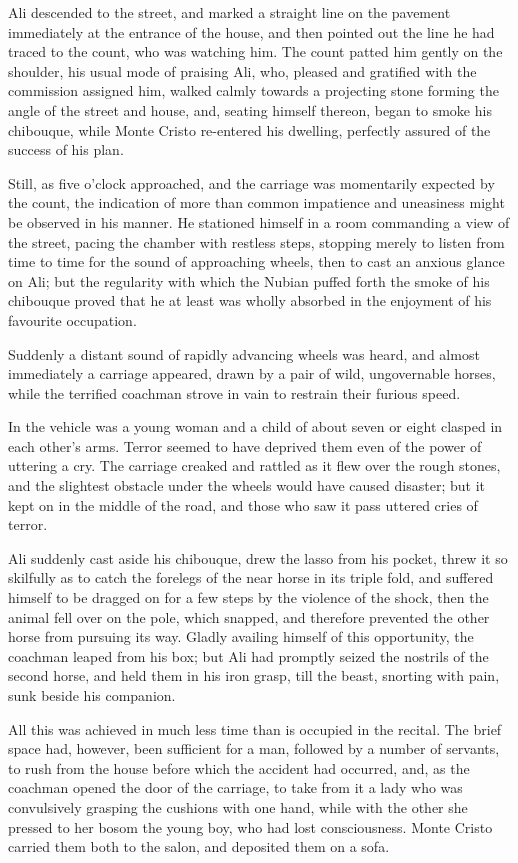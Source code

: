  Ali descended to the street, and marked a straight line on the pavement immediately at the entrance of the house, and then pointed out the line he had traced to the count, who was watching him. The count patted him gently on the shoulder, his usual mode of praising Ali, who, pleased and gratified with the commission assigned him, walked calmly towards a projecting stone forming the angle of the street and house, and, seating himself thereon, began to smoke his chibouque, while Monte Cristo re-entered his dwelling, perfectly assured of the success of his plan. 

 Still, as five o'clock approached, and the carriage was momentarily expected by the count, the indication of more than common impatience and uneasiness might be observed in his manner. He stationed himself in a room commanding a view of the street, pacing the chamber with restless steps, stopping merely to listen from time to time for the sound of approaching wheels, then to cast an anxious glance on Ali; but the regularity with which the Nubian puffed forth the smoke of his chibouque proved that he at least was wholly absorbed in the enjoyment of his favourite occupation. 

 Suddenly a distant sound of rapidly advancing wheels was heard, and almost immediately a carriage appeared, drawn by a pair of wild, ungovernable horses, while the terrified coachman strove in vain to restrain their furious speed. 

 In the vehicle was a young woman and a child of about seven or eight clasped in each other's arms. Terror seemed to have deprived them even of the power of uttering a cry. The carriage creaked and rattled as it flew over the rough stones, and the slightest obstacle under the wheels would have caused disaster; but it kept on in the middle of the road, and those who saw it pass uttered cries of terror. 

 Ali suddenly cast aside his chibouque, drew the lasso from his pocket, threw it so skilfully as to catch the forelegs of the near horse in its triple fold, and suffered himself to be dragged on for a few steps by the violence of the shock, then the animal fell over on the pole, which snapped, and therefore prevented the other horse from pursuing its way. Gladly availing himself of this opportunity, the coachman leaped from his box; but Ali had promptly seized the nostrils of the second horse, and held them in his iron grasp, till the beast, snorting with pain, sunk beside his companion. 

 All this was achieved in much less time than is occupied in the recital. The brief space had, however, been sufficient for a man, followed by a number of servants, to rush from the house before which the accident had occurred, and, as the coachman opened the door of the carriage, to take from it a lady who was convulsively grasping the cushions with one hand, while with the other she pressed to her bosom the young boy, who had lost consciousness. Monte Cristo carried them both to the salon, and deposited them on a sofa. 

